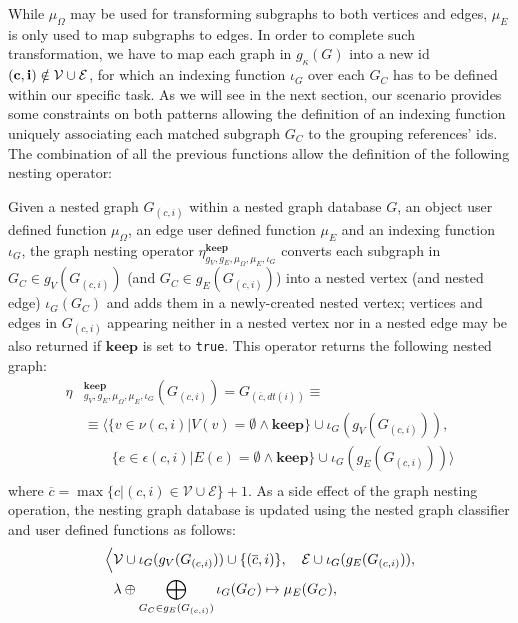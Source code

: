 While $\mu_\Omega$ may be used for transforming subgraphs to both vertices and edges, $\mu_E$ is only used to map subgraphs to edges.  
In order to complete such transformation, we have to map each graph in $g_\kappa(G)$ into a new id $(\textbf{c},\textbf{i})\notin \mathcal{V}\cup \mathcal{E}$, for which an indexing function $\iota_G$ over each $G_C$ has to be defined within our specific task. As we will see in the next section, our scenario provides some constraints on both patterns allowing the definition of an indexing function  uniquely associating each matched subgraph  $G_C$  to the grouping references' ids.
The combination of all the previous functions allow the definition of the following nesting operator:



\begin{definition}
Given a nested graph $G_{(c,i)}$ within a nested graph database $G$, an object user defined function $\mu_\Omega$, an edge user defined function $\mu_E$ and an indexing function $\iota_G$, the graph nesting operator $\eta_{g_V,g_E,\mu_\Omega,\mu_E,\iota_G}^{\textbf{keep}}$ converts each subgraph in $G_C\in g_V(G_{(c,i)})$ (and $G_C\in g_E(G_{(c,i)})$) into a nested vertex (and nested edge) $\iota_G(G_C)$ and adds them in a newly-created nested vertex; vertices and edges in $G_{(c,i)}$ appearing neither in a nested vertex nor in a nested edge may be also returned if $\textbf{keep}$ is set to \texttt{true}. This operator returns the following nested graph:
\[\begin{split}
\eta&{}_{g_V,g_E,\mu_\Omega,\mu_E,\iota_G}^{\textbf{keep}}(G_{(c,i)})=G_{(\overline{c},dt(i))}\equiv\\
&\equiv\Big\langle \{v\in \nu(c,i) | V(v)=\emptyset\wedge\textbf{keep} \}\cup \iota_G(g_V(G_{(c,i)})),\\
&\qquad \{e\in \epsilon(c,i) | E(e)=\emptyset\wedge\textbf{keep} \}\cup \iota_G(g_E(G_{(c,i)}))\Big\rangle\\
\end{split}\]
where $\overline{c}=\max\{c|(c,i)\in\mathcal{V}\cup\mathcal{E}\}+1$. As a side effect of the graph nesting operation, the nesting graph database is updated using the nested graph classifier and user defined functions as follows:
	\begin{align*}
	\Big\langle&\VS\cup \iota_G(g_V(G_{(c,i)}))\cup\{(\overline{c},i)\},\quad \ES\cup \iota_G(g_E(G_{(c,i)})),\\
	& \lambda\oplus \bigoplus_{G_C\in g_E(G_{(c,i)})}\iota_G(G_C)\mapsto \mu_E(G_C),\\

\end{align*}
\end{definition}
